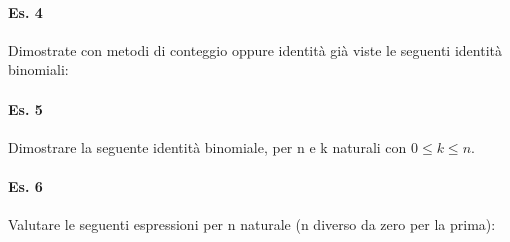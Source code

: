 \paragraph{Es. 4} Dimostrate con metodi di conteggio oppure identità già viste le seguenti identità binomiali:

\paragraph{Es. 5} %
Dimostrare la seguente identità binomiale, per n e k naturali con $0 \leq k \leq n$.

\paragraph{Es. 6}%
Valutare le seguenti espressioni per n naturale (n diverso da zero per la prima):


\newpage
